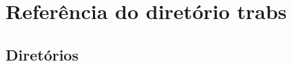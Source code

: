 \section{Referência do diretório trabs}
\label{dir_d119cd3e0fcb1d19a6b65e8cd0d472dd}
\subsection*{Diretórios}
\begin{DoxyCompactItemize}
\end{DoxyCompactItemize}
